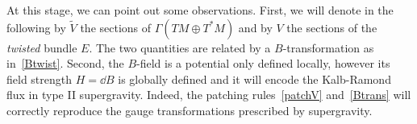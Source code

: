 \documentclass[debug]{phd}
\begin{document}
					
					At this stage, we can point out some observations.
					First, we will denote in the following by $\tilde{V}$ the sections of $\Gamma(TM \oplus T^*M)$ and by $V$ the sections of the \emph{twisted} bundle $E$.
					The two quantities are related by a $B$-transformation as in~\eqref{Btwist}.
					Second, the $B$-field is a potential only defined locally, however its field strength $H = \dd B$ is globally defined and it will encode the Kalb-Ramond flux in type II supergravity.
					Indeed, the patching rules~\eqref{patchV} and~\eqref{Btrans} will correctly reproduce the gauge transformations prescribed by supergravity.
					
\end{document}
